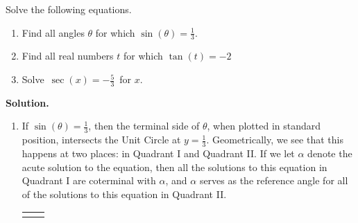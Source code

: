 \documentclass[12pt]{ximera}
\begin{document}
\begin{example}  \label{basicinverseeqns}  Solve the following equations.

\begin{enumerate}

\item  \label{basicinverseeqnssine} Find all angles $\theta$ for which $\sin(\theta) = \frac{1}{3}$.

\item \label{basicinverseeqnstangent} Find all real numbers $t$ for which $\tan(t) = -2$

\item  \label{basicinverseeqnssecant} Solve $\, \sec(x) = -\frac{5}{3} \,$ for $x$.

\end{enumerate}

{\bf Solution.}  

\begin{enumerate}

\item  If $\sin(\theta) = \frac{1}{3}$, then the terminal side of $\theta$, when plotted in standard position, intersects the Unit Circle at $y = \frac{1}{3}$.  Geometrically, we see that this happens at two places:  in Quadrant I and Quadrant II. If we let $\alpha$ denote the acute solution to the equation, then all the solutions to this equation in Quadrant I  are coterminal with $\alpha$, and $\alpha$ serves as the reference angle for all of the solutions to this equation in Quadrant II.

\begin{tabular}{cc}



&

\hspace{0.25in}

 \\


\end{tabular}
\end{enumerate}
\end{example}
\end{document}
